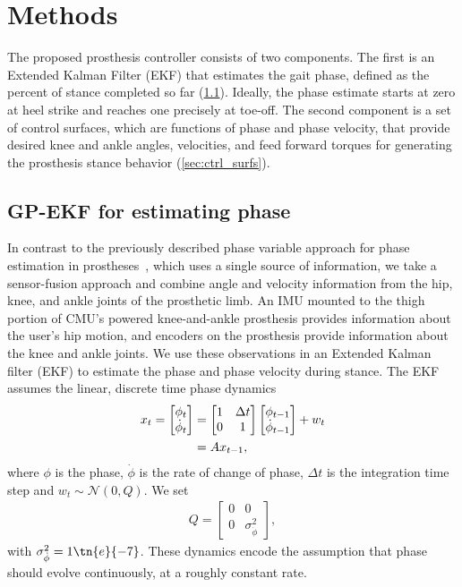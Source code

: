 \section{Methods}\label{sec:methods}

The proposed prosthesis controller consists of two components. The first is an
Extended Kalman Filter (EKF) that estimates the gait phase, defined as the
percent of stance completed so far (\cref{sec:gpekf}). Ideally, the phase
estimate starts at zero at heel strike and reaches one precisely at toe-off. The
second component is a set of control surfaces, which are functions of phase and
phase velocity, that provide desired knee and ankle angles, velocities, and feed
forward torques for generating the prosthesis stance behavior
(\cref{sec:ctrl_surfs}).

\subsection{GP-EKF for estimating phase}\label{sec:gpekf}

In contrast to the previously described phase variable approach for phase
estimation in prostheses~\citep{quintero2016preliminary}, which uses a single
source of information, we take a sensor-fusion approach and combine angle and
velocity information from the hip, knee, and ankle joints of the prosthetic
limb.  An IMU mounted to the thigh portion of CMU's powered knee-and-ankle
prosthesis provides information about the user's hip motion, and encoders on the
prosthesis provide information about the knee and ankle joints. We use these
observations in an Extended Kalman filter (EKF) to estimate the phase and phase
velocity during stance. The EKF assumes the linear, discrete time phase dynamics
\begin{align}
    x_t = \begin{bmatrix} \phi_t \\ \dot{\phi}_t \end{bmatrix} 
        &= \begin{bmatrix} 1 & \Delta t \\ 0 & 1 \end{bmatrix} 
            \begin{bmatrix} \phi_{t-1} \\ \dot{\phi}_{t-1} \end{bmatrix} + w_t
            \label{eq:dyn_mdl} \\
        &= A x_{t-1}, \notag
\end{align}
where $\phi$ is the phase, $\dot{\phi}$ is the rate of change of phase, $\Delta
t$ is the integration time step and $w_t \sim \mathcal{N}(0, Q)$. We set
\begin{align}
    Q = \begin{bmatrix} 0 & 0 \\ 0 & \sigma_{\dot{\phi}}^2 \end{bmatrix},
\end{align}
with $\sigma_{\dot{\phi}}^2 = 1\tn{e}{-7}$. These dynamics encode the
assumption that phase should evolve continuously, at a roughly constant rate.

